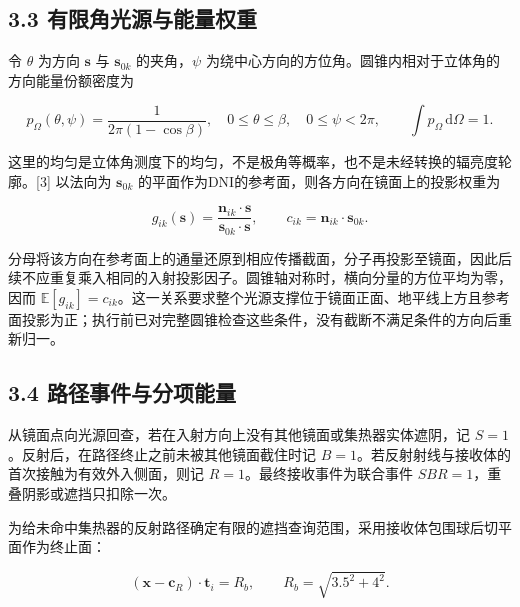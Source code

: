 \documentclass[UTF8,fontset=windows,zihao=-4]{ctexart}
\begin{document}
\subsection*{3.3 有限角光源与能量权重}

\par\noindent\begin{minipage}{\linewidth}
令 \(\theta\) 为方向 \(\boldsymbol s\) 与 \(\boldsymbol s_{0k}\) 的夹角，\(\psi\) 为绕中心方向的方位角。圆锥内相对于立体角的方向能量份额密度为

\[
p_\Omega(\theta,\psi)=\frac{1}{2\pi(1-\cos\beta)},
\quad 0\le\theta\le\beta,\quad0\le\psi<2\pi,
\qquad\int p_\Omega\,\mathrm d\Omega=1.
\tag{6}
\]
\end{minipage}\par

\par\noindent\begin{minipage}{\linewidth}
这里的均匀是立体角测度下的均匀，不是极角等概率，也不是未经转换的辐亮度轮廓。[3] 以法向为 \(\boldsymbol s_{0k}\) 的平面作为DNI的参考面，则各方向在镜面上的投影权重为

\[
g_{ik}(\boldsymbol s)=\frac{\boldsymbol n_{ik}\cdot\boldsymbol s}{\boldsymbol s_{0k}\cdot\boldsymbol s},
\qquad c_{ik}=\boldsymbol n_{ik}\cdot\boldsymbol s_{0k}.
\tag{7}
\]
\end{minipage}\par

分母将该方向在参考面上的通量还原到相应传播截面，分子再投影至镜面，因此后续不应重复乘入相同的入射投影因子。圆锥轴对称时，横向分量的方位平均为零，因而 \(\mathbb E[g_{ik}]=c_{ik}\)。这一关系要求整个光源支撑位于镜面正面、地平线上方且参考面投影为正；执行前已对完整圆锥检查这些条件，没有截断不满足条件的方向后重新归一。

\subsection*{3.4 路径事件与分项能量}

从镜面点向光源回查，若在入射方向上没有其他镜面或集热器实体遮阴，记 \(S=1\)。反射后，在路径终止之前未被其他镜面截住时记 \(B=1\)。若反射射线与接收体的首次接触为有效外入侧面，则记 \(R=1\)。最终接收事件为联合事件 \(SBR=1\)，重叠阴影或遮挡只扣除一次。

\par\noindent\begin{minipage}{\linewidth}
为给未命中集热器的反射路径确定有限的遮挡查询范围，采用接收体包围球后切平面作为终止面：

\[
(\boldsymbol x-\boldsymbol c_R)\cdot\boldsymbol t_i=R_b,
\qquad R_b=\sqrt{3.5^2+4^2}.
\tag{8}
\]
\end{minipage}\par
\end{document}
